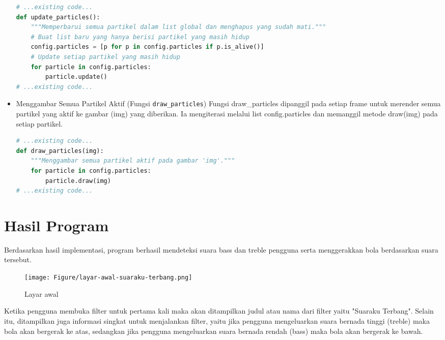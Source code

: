 \documentclass[11pt,a4paper]{article}
\begin{document}
\begin{itemize}
\begin{lstlisting}[language=Python, caption=Fungsi update\_particles]
# ...existing code...
def update_particles():
    """Memperbarui semua partikel dalam list global dan menghapus yang sudah mati."""
    # Buat list baru yang hanya berisi partikel yang masih hidup
    config.particles = [p for p in config.particles if p.is_alive()]
    # Update setiap partikel yang masih hidup
    for particle in config.particles:
        particle.update()
# ...existing code...
\end{lstlisting}
\item Menggambar Semua Partikel Aktif (Fungsi \texttt{draw\_particles})
\newline Fungsi draw\_particles dipanggil pada setiap frame untuk merender semua partikel yang aktif ke gambar (img) yang diberikan. Ia mengiterasi melalui list config.particles dan memanggil metode draw(img) pada setiap partikel.
\begin{lstlisting}[language=Python, caption=Fungsi draw\_particles]
# ...existing code...
def draw_particles(img):
    """Menggambar semua partikel aktif pada gambar 'img'."""
    for particle in config.particles:
        particle.draw(img)
# ...existing code...
\end{lstlisting}
\end{itemize}
\section{Hasil Program}
Berdasarkan hasil implementasi, program berhasil mendeteksi suara bass dan treble pengguna serta menggerakkan bola berdasarkan suara tersebut.

\begin{figure}[h]
    \centering
    \texttt{[image: Figure/layar-awal-suaraku-terbang.png]}
    \caption{Layar awal}
    \label{fig:my_label}
\end{figure}

Ketika pengguna membuka filter untuk pertama kali maka akan ditampilkan judul atau nama dari filter yaitu "Suaraku Terbang". Selain itu, ditampilkan juga informasi singkat untuk menjalankan filter, yaitu jika pengguna mengeluarkan suara bernada tinggi (treble) maka bola akan bergerak ke atas, sedangkan jika pengguna mengeluarkan suara bernada rendah (bass) maka bola akan bergerak ke bawah.
\end{document}
